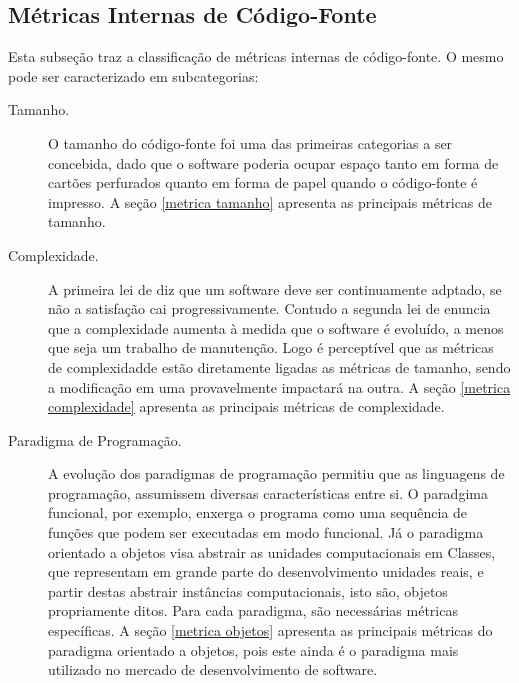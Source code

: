 	\subsection {Métricas Internas de Código-Fonte}
	\label {Métricas Internas de Código-Fonte}

	Esta subseção traz a classificação de métricas internas de código-fonte. O mesmo pode ser caracterizado em subcategorias:

	\begin{description}
	\item [Tamanho.]  O tamanho do código-fonte foi uma das primeiras categorias a ser concebida, dado que o software poderia ocupar espaço tanto em forma de cartões perfurados quanto em forma de papel quando o código-fonte é impresso. A seção \ref{metrica tamanho} apresenta as principais métricas de tamanho. 

	\item [Complexidade.] A primeira lei de  diz que um software deve ser continuamente adptado, se não a satisfação cai progressivamente.  Contudo a segunda lei de  enuncia que a complexidade aumenta à medida que o software é evoluído, a menos que seja um trabalho de manutenção. Logo é perceptível que as métricas de complexidadde estão diretamente ligadas as métricas de tamanho, sendo a modificação em uma provavelmente impactará na outra. A seção \ref{metrica complexidade} apresenta as principais métricas de complexidade.

	\item [Paradigma de Programação.] A evolução dos paradigmas de programação permitiu que as linguagens de programação, assumissem diversas características entre si. O paradgima funcional, por exemplo, enxerga o programa como uma sequência de funções que podem ser executadas em modo funcional. Já o paradigma orientado a objetos visa abstrair as unidades computacionais em Classes, que representam em grande parte do desenvolvimento unidades reais, e partir destas abstrair instâncias computacionais, isto são, objetos propriamente ditos. Para cada paradigma, são necessárias métricas específicas. A seção \ref{metrica objetos} apresenta as principais métricas do paradigma orientado a objetos, pois este ainda é o paradigma mais utilizado no mercado de desenvolvimento de software. 
	\end{description}

